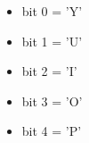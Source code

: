 \begin{itemize}
\item[] bit 0 = 'Y'
\item[] bit 1 = 'U'
\item[] bit 2 = 'I'
\item[] bit 3 = 'O'
\item[] bit 4 = 'P'
\end{itemize}

